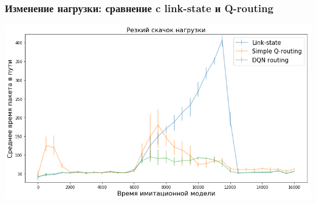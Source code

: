 \documentclass{beamer}
\begin{document}

\begin{frame}
  \frametitle{Изменение нагрузки: сравнение c link-state и Q-routing}
  \includegraphics[width=\textwidth]{experiment-peak-load} 
\end{frame}

\end{document}
